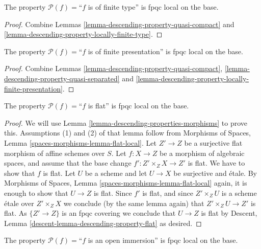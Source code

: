\begin{lemma}
\label{lemma-descending-property-finite-type}
The property $\mathcal{P}(f) =$``$f$ is of finite type''
is fpqc local on the base.
\end{lemma}

\begin{proof}
Combine Lemmas \ref{lemma-descending-property-quasi-compact}
and \ref{lemma-descending-property-locally-finite-type}.
\end{proof}

\begin{lemma}
\label{lemma-descending-property-finite-presentation}
The property $\mathcal{P}(f) =$``$f$ is of finite presentation''
is fpqc local on the base.
\end{lemma}

\begin{proof}
Combine Lemmas \ref{lemma-descending-property-quasi-compact},
\ref{lemma-descending-property-quasi-separated} and
\ref{lemma-descending-property-locally-finite-presentation}.
\end{proof}

\begin{lemma}
\label{lemma-descending-property-flat}
The property $\mathcal{P}(f) =$``$f$ is flat''
is fpqc local on the base.
\end{lemma}

\begin{proof}
We will use
Lemma \ref{lemma-descending-properties-morphisms}
to prove this. Assumptions (1) and (2) of that lemma follow from
Morphisms of Spaces,
Lemma \ref{spaces-morphisms-lemma-flat-local}.
Let $Z' \to Z$ be a surjective flat morphism of affine schemes over $S$.
Let $f : X \to Z$ be a morphism of algebraic spaces, and assume
that the base change $f' : Z' \times_Z X \to Z'$ is flat.
We have to show that $f$ is flat. Let $U$ be a scheme
and let $U \to X$ be surjective and \'etale. By
Morphisms of Spaces,
Lemma \ref{spaces-morphisms-lemma-flat-local}
again, it is enough to show that $U \to Z$ is flat.
Since $f'$ is flat, and since $Z' \times_Z U$ is a
scheme \'etale over $Z' \times_Z X$ we conclude (by the same lemma again) that
$Z' \times_Z U \to Z'$ is flat.
As $\{Z' \to Z\}$ is an fpqc covering we conclude that
$U \to Z$ is flat by
Descent, Lemma \ref{descent-lemma-descending-property-flat}
as desired.
\end{proof}

\begin{lemma}
\label{lemma-descending-property-open-immersion}
The property $\mathcal{P}(f) =$``$f$ is an open immersion''
is fpqc local on the base.
\end{lemma}

